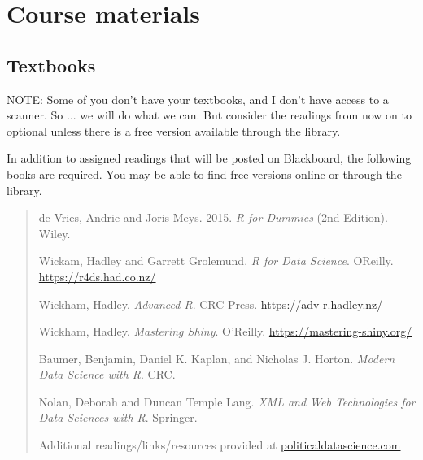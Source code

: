 \documentclass[11pt]{article}
\begin{document}
\section*{Course materials}

\subsection*{Textbooks}

NOTE: Some of you don't have your textbooks, and I don't have access to a scanner.  So ... we will do what we can.  But consider the readings from now on to optional unless there is a free version available through the library.  


In addition to assigned readings that will be posted on Blackboard,
the following books are required.  You may be able to find free
versions online or through the library. \singlespacing


\begin{quote}
\noindent de Vries, Andrie and Joris Meys. 2015.  \textit{R for
  Dummies} (2nd Edition). Wiley. 
\vspace{.2cm}

\noindent Wickam, Hadley and Garrett Grolemund. \textit{R for Data Science}. OReilly.  
\url{https://r4ds.had.co.nz/}

\vspace{.2cm}

\noindent Wickham, Hadley.  \textit{Advanced R}. CRC Press. \url{https://adv-r.hadley.nz/}
\vspace{.2cm}

\noindent Wickham, Hadley.  \textit{Mastering Shiny}. O'Reilly. \url{https://mastering-shiny.org/}
\vspace{.2cm}

\noindent Baumer, Benjamin, Daniel K. Kaplan, and Nicholas J. Horton. \textit{Modern Data Science with R}. CRC. 

\noindent Nolan, Deborah and Duncan Temple Lang.  \textit{XML and Web Technologies for Data Sciences with R}.  Springer.


Additional readings/links/resources provided at \url{politicaldatascience.com}
\vspace{.2cm}





\end{quote}





\end{document}
